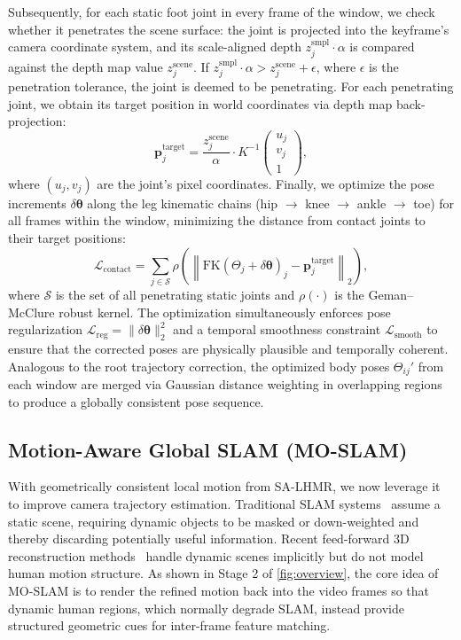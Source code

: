 \documentclass[runningheads]{llncs}
\begin{document}
Subsequently, for each static foot joint in every frame of the window, we check whether it penetrates the scene surface: the joint is projected into the keyframe's camera coordinate system, and its scale-aligned depth $z_j^{\text{smpl}} \cdot \alpha$ is compared against the depth map value $z_j^{\text{scene}}$. If $z_j^{\text{smpl}} \cdot \alpha > z_j^{\text{scene}} + \epsilon$, where $\epsilon$ is the penetration tolerance, the joint is deemed to be penetrating. For each penetrating joint, we obtain its target position in world coordinates via depth map back-projection:
%
\begin{equation}
  \mathbf{p}_j^{\text{target}} = \frac{z_j^{\text{scene}}}{\alpha} \cdot K^{-1} \begin{pmatrix} u_j \\ v_j \\ 1 \end{pmatrix}, 
\end{equation}
%
where $(u_j, v_j)$ are the joint's pixel coordinates. Finally, we optimize the pose increments $\delta\boldsymbol{\theta}$ along the leg kinematic chains (hip $\to$ knee $\to$ ankle $\to$ toe) for all frames within the window, minimizing the distance from contact joints to their target positions:
%
\begin{equation}
  \mathcal{L}_{\text{contact}} = \sum_{j \in \mathcal{S}} \rho\!\left(\left\|\text{FK}(\Theta_j + \delta\boldsymbol{\theta})_j - \mathbf{p}_j^{\text{target}}\right\|_2\right), 
\end{equation}
%
where $\mathcal{S}$ is the set of all penetrating static joints and $\rho(\cdot)$ is the Geman--McClure robust kernel. The optimization simultaneously enforces pose regularization $\mathcal{L}_{\text{reg}} = \|\delta\boldsymbol{\theta}\|_2^2$ and a temporal smoothness constraint $\mathcal{L}_{\text{smooth}}$ to ensure that the corrected poses are physically plausible and temporally coherent. Analogous to the root trajectory correction, the optimized body poses $\Theta_{ij}'$ from each window are merged via Gaussian distance weighting in overlapping regions to produce a globally consistent pose sequence.



\subsection{Motion-Aware Global SLAM (MO-SLAM)}
\label{sec:mo-slam}

With geometrically consistent local motion from SA-LHMR, we now leverage it to improve camera trajectory estimation. Traditional SLAM systems~\cite{ORBSLAM3,DROIDSLAM2021,DPVO2023} assume a static scene, requiring dynamic objects to be masked or down-weighted and thereby discarding potentially useful information. Recent feed-forward 3D reconstruction methods~\cite{DUSt3R2024,MonST3R2024,MASt3RSLAM2025} handle dynamic scenes implicitly but do not model human motion structure. As shown in Stage 2 of \cref{fig:overview}, the core idea of MO-SLAM is to render the refined motion back into the video frames so that dynamic human regions, which normally degrade SLAM, instead provide structured geometric cues for inter-frame feature matching.
\end{document}
